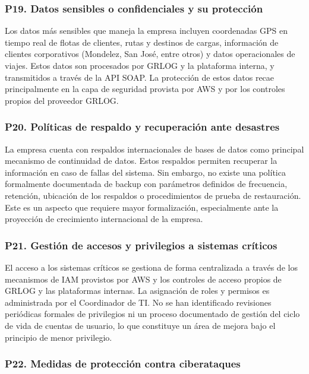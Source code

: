 \documentclass[12pt]{article}
\begin{document}
\subsubsection*{\textbf{P19. Datos sensibles o confidenciales y su protecci\'on}}

Los datos m\'as sensibles que maneja la empresa incluyen coordenadas GPS en tiempo real de
flotas de clientes, rutas y destinos de cargas, informaci\'on de clientes corporativos
(Mondelez, San Jos\'e, entre otros) y datos operacionales de viajes. Estos datos son
procesados por GRLOG y la plataforma interna, y transmitidos a trav\'es de la API SOAP.
La protecci\'on de estos datos recae principalmente en la capa de seguridad provista por
AWS y por los controles propios del proveedor GRLOG.

\subsubsection*{\textbf{P20. Pol\'iticas de respaldo y recuperaci\'on ante desastres}}

La empresa cuenta con respaldos internacionales de bases de datos como principal mecanismo
de continuidad de datos. Estos respaldos permiten recuperar la informaci\'on en caso de
fallas del sistema. Sin embargo, no existe una pol\'itica formalmente documentada de backup
con par\'ametros definidos de frecuencia, retenci\'on, ubicaci\'on de los respaldos o
procedimientos de prueba de restauraci\'on. Este es un aspecto que requiere mayor
formalizaci\'on, especialmente ante la proyecci\'on de crecimiento internacional de la empresa.

\subsubsection*{\textbf{P21. Gesti\'on de accesos y privilegios a sistemas cr\'iticos}}

El acceso a los sistemas cr\'iticos se gestiona de forma centralizada a trav\'es de los
mecanismos de IAM provistos por AWS y los controles de acceso propios de GRLOG y las
plataformas internas. La asignaci\'on de roles y permisos es administrada por el Coordinador
de TI. No se han identificado revisiones peri\'odicas formales de privilegios ni un proceso
documentado de gesti\'on del ciclo de vida de cuentas de usuario, lo que constituye un
\'area de mejora bajo el principio de menor privilegio.

\subsubsection*{\textbf{P22. Medidas de protecci\'on contra ciberataques}}
\end{document}
